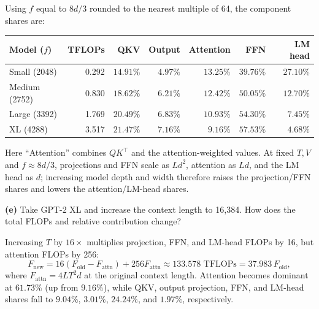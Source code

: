 Using $f$ equal to $8d/3$ rounded to the nearest multiple of 64,
the component shares are:
\begin{center}
\small
\begin{tabular}{lrrrrrr}
\toprule
Model ($f$) & TFLOPs & QKV & Output & Attention & FFN & LM head \\
\midrule
Small (2048) & 0.292 & $14.91\%$ & $4.97\%$ & $13.25\%$ & $39.76\%$ & $27.10\%$ \\
Medium (2752) & 0.830 & $18.62\%$ & $6.21\%$ & $12.42\%$ & $50.05\%$ & $12.70\%$ \\
Large (3392) & 1.769 & $20.49\%$ & $6.83\%$ & $10.93\%$ & $54.30\%$ & $7.45\%$ \\
XL (4288) & 3.517 & $21.47\%$ & $7.16\%$ & $9.16\%$ & $57.53\%$ & $4.68\%$ \\
\bottomrule
\end{tabular}
\end{center}
Here ``Attention'' combines $QK^\top$ and the attention-weighted values.
At fixed $T,V$ and $f\approx8d/3$, projections and FFN scale as $Ld^2$,
attention as $Ld$, and the LM head as $d$; increasing model depth and width
therefore raises the projection/FFN shares and lowers the attention/LM-head shares.

\textbf{(e)} Take GPT-2 XL and increase the context length to 16{,}384. How does the total FLOPs and relative contribution change?


Increasing $T$ by $16\times$ multiplies projection, FFN,
and LM-head FLOPs by 16, but attention FLOPs by 256:
\[
F_{\mathrm{new}}
=16(F_{\mathrm{old}}-F_{\mathrm{attn}})+256F_{\mathrm{attn}}
\approx133.578\text{ TFLOPs}=37.983\,F_{\mathrm{old}},
\]
where $F_{\mathrm{attn}}=4LT^2d$ at the original context length.
Attention becomes dominant at $61.73\%$ (up from $9.16\%$), while QKV,
output projection, FFN, and LM-head shares fall to $9.04\%$, $3.01\%$,
$24.24\%$, and $1.97\%$, respectively.


